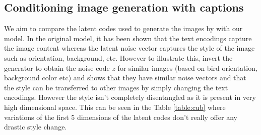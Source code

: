 \documentclass{article}
\begin{document}
\subsection{Conditioning image generation with captions}
We aim to compare the latent codes used to generate the images by \cite{text2image} with our model. In the original model, it has been shown that the text
encodings capture the image content whereas the latent noise vector captures the
style of the image such as orientation, background, etc. However to illustrate
this, \cite{text2image} invert the generator to obtain the
noise code $z$ for similar images (based on bird orientation, background color
etc) and shows that they have similar noise vectors and that the style can be
transferred to other images by simply changing the text encodings. However the
style isn't completely disentangled as it is present in very high dimensional
space. This can be seen in the Table \ref{table:cub} where variations of the first 5
dimensions of the latent codes don't really offer any drastic style change.
\end{document}
